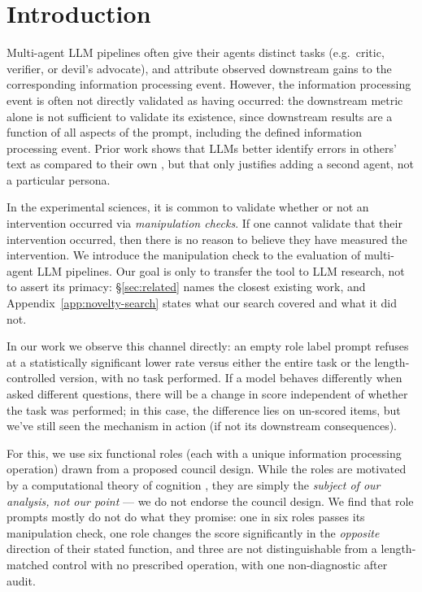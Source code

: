 \section{Introduction}

Multi-agent LLM pipelines often give their agents distinct tasks (e.g.\ critic, verifier, or
devil's advocate), and attribute observed downstream gains to the corresponding information
processing event. However, the information processing event is often not directly validated as
having occurred: the downstream metric alone is not sufficient to validate its existence, since
downstream results are a function of all aspects of the prompt, including the defined
information processing event. Prior work shows that LLMs better identify errors in others' text
as compared to their own \citep{chen2026selfcorrection,stechly2024selfverification}, but that
only justifies adding a second agent, not a particular persona.

In the experimental sciences, it is common to validate whether or not an intervention occurred
via \emph{manipulation checks}. If one cannot validate that their intervention occurred, then
there is no reason to believe they have measured the intervention. We introduce the manipulation
check to the evaluation of multi-agent LLM pipelines. Our goal is only to transfer the tool to
LLM research, not to assert its primacy: \S\ref{sec:related} names the closest existing work,
and Appendix~\ref{app:novelty-search} states what our search covered and what it did not.

In our work we observe this channel directly: an empty role label prompt refuses at a
statistically significant lower rate versus either the entire task or the length-controlled
version, with no task performed. If a model behaves differently when asked different questions,
there will be a change in score independent of whether the task was performed; in this case, the
difference lies on un-scored items, but we've still seen the mechanism in action (if not its
downstream consequences).

For this, we use six functional roles (each with a unique information processing operation)
drawn from a proposed council design. While the roles are motivated by a computational theory of
cognition \citep{lee2025emergence}, they are simply the \emph{subject of our analysis, not our
point} --- we do not endorse the council design. We find that role prompts mostly do not do what
they promise: one in six roles passes its manipulation check, one role changes the score
significantly in the \emph{opposite} direction of their stated function, and three are not
distinguishable from a length-matched control with no prescribed operation, with one
non-diagnostic after audit.

